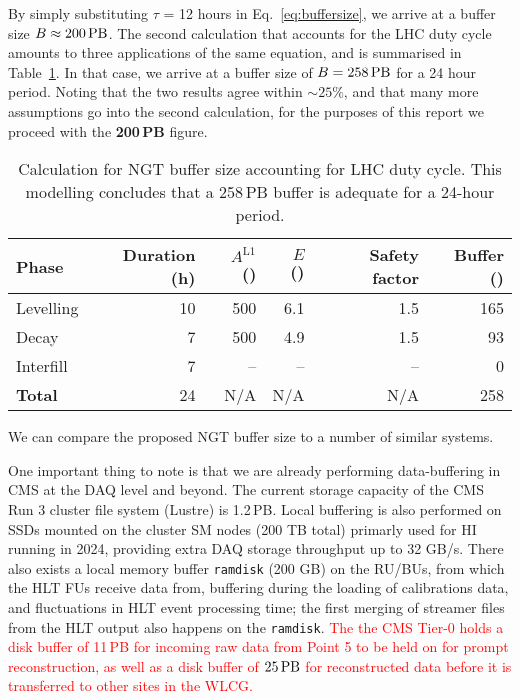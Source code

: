 By simply substituting $\tau$ = 12 hours in Eq.~\ref{eq:buffersize}, we arrive at a buffer size $B \approx 200\,\text{PB}$.
The second calculation that accounts for the LHC duty cycle amounts to three applications of the same equation,
and is summarised in Table~\ref{tab:bufferWithDutyCycle}. In that case, we arrive at a buffer size of $B = 258\,\text{PB}$ for a 24 hour period.
Noting that the two results agree within $\sim25\%$, and that many more assumptions go into the second calculation, for the purposes of this report we proceed with the \textbf{200\,PB} figure.
\begin{table}[htbp]
   \centering
   \begin{tabular}{@{} lrrrrr @{}} %
      \toprule
		Phase & Duration (h) & $A^{\text{L1}}$ (\kHz) & $E$ (\MB) & Safety factor & Buffer (\PB)\\
      	\midrule
		Levelling & 10 & 500 & 6.1 & 1.5 & 165 \\
		Decay     &  7 & 500 & 4.9 & 1.5 &  93 \\
		Interfill &  7 &  -- &  -- &  -- &   0 \\
		\midrule
\textbf{Total}    & 24 & N/A & N/A & N/A & 258\\ 
      \bottomrule
   \end{tabular}
   \caption{Calculation for NGT buffer size accounting for LHC duty cycle. 
   This modelling concludes that a 258\,PB buffer is adequate for a 24-hour period.}
   \label{tab:bufferWithDutyCycle}
\end{table}

We can compare the proposed NGT buffer size to a number of similar systems. 

One important thing to note is that we are already performing data-buffering in CMS at the DAQ level and beyond. The current storage capacity of the CMS Run 3 cluster file system (Lustre) is 1.2\,PB. Local buffering is also performed on SSDs mounted on the cluster SM nodes (200 TB total) primarly used for HI running in 2024, providing extra DAQ storage throughput up to 32 GB/s. There also exists a local memory buffer \texttt{ramdisk} (200 GB) on the RU/BUs, from which the HLT FUs receive data from, buffering during the loading of calibrations data, and fluctuations in HLT event processing time; the first merging of streamer files from the HLT output also happens on the \texttt{ramdisk}. \textcolor{red}{The the CMS Tier-0 holds a disk buffer of 11\,PB for incoming raw data from Point 5 to be held on for prompt reconstruction,
as well as a disk buffer of $25\,\text{PB}$ for reconstructed data before it is transferred to other sites in the WLCG.}

